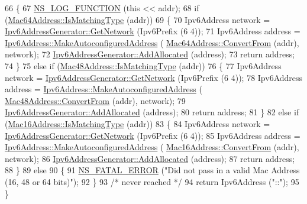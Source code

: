 \begin{DoxyCode}
66 \{
67   \hyperlink{log-macros-disabled_8h_a90b90d5bad1f39cb1b64923ea94c0761}{NS\_LOG\_FUNCTION} (\textcolor{keyword}{this} << addr);
68   \textcolor{keywordflow}{if} (\hyperlink{classns3_1_1Mac64Address_a50014d1350f72b89857f0262be927073}{Mac64Address::IsMatchingType} (addr))
69     \{
70       Ipv6Address network = \hyperlink{classns3_1_1Ipv6AddressGenerator_a3d153f59d37c8012186db6a18db5681c}{Ipv6AddressGenerator::GetNetwork} (Ipv6Prefix (6
      4));
71       Ipv6Address address = \hyperlink{classns3_1_1Ipv6Address_a74e6a79f61e9edd0ebdbafb4db88dc35}{Ipv6Address::MakeAutoconfiguredAddress} (
      \hyperlink{classns3_1_1Mac64Address_a9d73aef28cf6b6edf423b418ce014b10}{Mac64Address::ConvertFrom} (addr), network);
72       \hyperlink{classns3_1_1Ipv6AddressGenerator_a906de97d82d4e6898eb8d019bc81077f}{Ipv6AddressGenerator::AddAllocated} (address);
73       \textcolor{keywordflow}{return} address;
74     \}
75   \textcolor{keywordflow}{else} \textcolor{keywordflow}{if} (\hyperlink{classns3_1_1Mac48Address_a55cc1e3c6aa63fd1a4f8f7d9be4ae182}{Mac48Address::IsMatchingType} (addr))
76     \{
77       Ipv6Address network = \hyperlink{classns3_1_1Ipv6AddressGenerator_a3d153f59d37c8012186db6a18db5681c}{Ipv6AddressGenerator::GetNetwork} (Ipv6Prefix (6
      4));
78       Ipv6Address address = \hyperlink{classns3_1_1Ipv6Address_a74e6a79f61e9edd0ebdbafb4db88dc35}{Ipv6Address::MakeAutoconfiguredAddress} (
      \hyperlink{classns3_1_1Mac48Address_a911ce13603a9ef837545a032b6523ae4}{Mac48Address::ConvertFrom} (addr), network);
79       \hyperlink{classns3_1_1Ipv6AddressGenerator_a906de97d82d4e6898eb8d019bc81077f}{Ipv6AddressGenerator::AddAllocated} (address);
80       \textcolor{keywordflow}{return} address;
81     \}
82   \textcolor{keywordflow}{else} \textcolor{keywordflow}{if} (\hyperlink{classns3_1_1Mac16Address_a2d7aa9e24afc8e02a25ab449b0b99b1f}{Mac16Address::IsMatchingType} (addr))
83     \{
84       Ipv6Address network = \hyperlink{classns3_1_1Ipv6AddressGenerator_a3d153f59d37c8012186db6a18db5681c}{Ipv6AddressGenerator::GetNetwork} (Ipv6Prefix (6
      4));
85       Ipv6Address address = \hyperlink{classns3_1_1Ipv6Address_a74e6a79f61e9edd0ebdbafb4db88dc35}{Ipv6Address::MakeAutoconfiguredAddress} (
      \hyperlink{classns3_1_1Mac16Address_a6822cde696a7be24782dc8e1de2f1449}{Mac16Address::ConvertFrom} (addr), network);
86       \hyperlink{classns3_1_1Ipv6AddressGenerator_a906de97d82d4e6898eb8d019bc81077f}{Ipv6AddressGenerator::AddAllocated} (address);
87       \textcolor{keywordflow}{return} address;
88     \}
89   \textcolor{keywordflow}{else}
90     \{
91       \hyperlink{group__fatal_ga5131d5e3f75d7d4cbfd706ac456fdc85}{NS\_FATAL\_ERROR} (\textcolor{stringliteral}{"Did not pass in a valid Mac Address (16, 48 or 64 bits)"});
92     \}
93   \textcolor{comment}{/* never reached */}
94   \textcolor{keywordflow}{return} Ipv6Address (\textcolor{stringliteral}{"::"});
95 \}
\end{DoxyCode}


